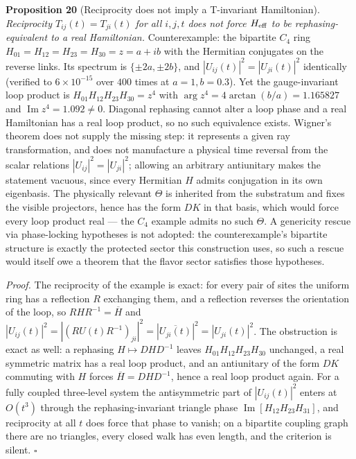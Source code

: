 \documentclass[
]{article}
\begin{document}
\textbf{Proposition 20} (Reciprocity does not imply a T-invariant
Hamiltonian). \emph{Reciprocity \(T_{ij}(t)=T_{ji}(t)\) for all
\(i,j,t\) does not force \(H_{\rm eff}\) to be rephasing-equivalent to a
real Hamiltonian.} Counterexample: the bipartite \(C_4\) ring
\(H_{01}=H_{12}=H_{23}=H_{30}=z=a+ib\) with the Hermitian conjugates on
the reverse links. Its spectrum is \(\{\pm2a,\pm2b\}\), and
\(|U_{ij}(t)|^2=|U_{ji}(t)|^2\) identically (verified to
\(6\times10^{-15}\) over \(400\) times at \(a=1,b=0.3\)). Yet the
gauge-invariant loop product is \(H_{01}H_{12}H_{23}H_{30}=z^4\) with
\(\arg z^4=4\arctan(b/a)=1.165827\) and
\(\operatorname{Im}z^4=1.092\neq0\). Diagonal rephasing cannot alter a
loop phase and a real Hamiltonian has a real loop product, so no such
equivalence exists. Wigner's theorem does not supply the missing step:
it represents a given ray transformation, and does not manufacture a
physical time reversal from the scalar relations
\(|U_{ij}|^2=|U_{ji}|^2\); allowing an arbitrary antiunitary makes the
statement vacuous, since every Hermitian \(H\) admits conjugation in its
own eigenbasis. The physically relevant \(\Theta\) is inherited from the
substratum and fixes the visible projectors, hence has the form \(DK\)
in that basis, which would force every loop product real --- the \(C_4\)
example admits no such \(\Theta\). A genericity rescue via phase-locking
hypotheses is not adopted: the counterexample's bipartite structure is
exactly the protected sector this construction uses, so such a rescue
would itself owe a theorem that the flavor sector satisfies those
hypotheses.

\emph{Proof.} The reciprocity of the example is exact: for every pair of
sites the uniform ring has a reflection \(R\) exchanging them, and a
reflection reverses the orientation of the loop, so
\(RHR^{-1}=\overline{H}\) and
\(|U_{ij}(t)|^2=|(RU(t)R^{-1})_{ji}|^2=|\overline{U_{ji}(t)}|^2=|U_{ji}(t)|^2\).
The obstruction is exact as well: a rephasing \(H\mapsto DHD^{-1}\)
leaves \(H_{01}H_{12}H_{23}H_{30}\) unchanged, a real symmetric matrix
has a real loop product, and an antiunitary of the form \(DK\) commuting
with \(H\) forces \(\overline{H}=DHD^{-1}\), hence a real loop product
again. For a fully coupled three-level system the antisymmetric part of
\(|U_{ij}(t)|^2\) enters at \(O(t^3)\) through the rephasing-invariant
triangle phase \(\operatorname{Im}[H_{12}H_{23}H_{31}]\), and
reciprocity at all \(t\) does force that phase to vanish; on a bipartite
coupling graph there are no triangles, every closed walk has even
length, and the criterion is silent. \(\square\)
\end{document}
